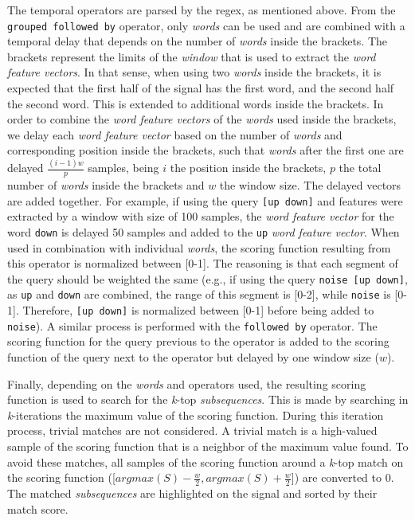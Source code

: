The temporal operators are parsed by the \gls{regex}, as mentioned above. From the \texttt{grouped followed by} operator, only \textit{words} can be used and are combined with a temporal delay that depends on the number of \textit{words} inside the brackets. The brackets represent the limits of the \textit{window} that is used to extract the \textit{word feature vectors}. In that sense, when using two \textit{words} inside the brackets, it is expected that the first half of the signal has the first word, and the second half the second word. This is extended to additional words inside the brackets. In order to combine the \textit{word feature vectors} of the \textit{words} used inside the brackets, we delay each \textit{word feature vector} based on the number of \textit{words} and corresponding position inside the brackets, such that \textit{words} after the first one are delayed $\frac{(i-1)w}{p}$ samples, being $i$ the position inside the brackets, $p$ the total number of \textit{words} inside the brackets and $w$ the window size. The delayed vectors are added together. For example, if using the query \texttt{[up down]} and features were extracted by a window with size of 100 samples, the \textit{word feature vector} for the word \texttt{down} is delayed 50 samples and added to the \texttt{up} \textit{word feature vector}. When used in combination with individual \textit{words}, the scoring function resulting from this operator is normalized between [0-1]. The reasoning is that each segment of the query should be weighted the same (e.g., if using the query \texttt{noise [up down]}, as \texttt{up} and \texttt{down} are combined, the range of this segment is [0-2], while \texttt{noise} is [0-1]. Therefore, \texttt{[up down]} is normalized between [0-1] before being added to \texttt{noise}). A similar process is performed with the \texttt{followed by} operator. The scoring function for the query previous to the operator is added to the scoring function of the query next to the operator but delayed by one window size ($w$).
\par
Finally, depending on the \textit{words} and operators used, the resulting scoring function is used to search for the \textit{k}-top \textit{subsequences}. This is made by searching in \textit{k}-iterations the maximum value of the scoring function. During this iteration process, trivial matches are not considered. A trivial match is a high-valued sample of the scoring function that is a neighbor of the maximum value found. To avoid these matches, all samples of the scoring function around a \textit{k}-top match on the scoring function ([$argmax(S)-\frac{w}{2}, argmax(S)+\frac{w}{2}$]) are converted to $0$. The matched \textit{subsequences} are highlighted on the signal and sorted by their match score.